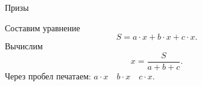 \begin{tutorial}{Призы}

Составим уравнение
$$S = a \cdot x + b \cdot x + c \cdot x.$$
Вычислим
$$x = \frac{S}{a + b + c}.$$
Через пробел печатаем: $a \cdot x \quad b \cdot x \quad c \cdot x$.


\end{tutorial}
